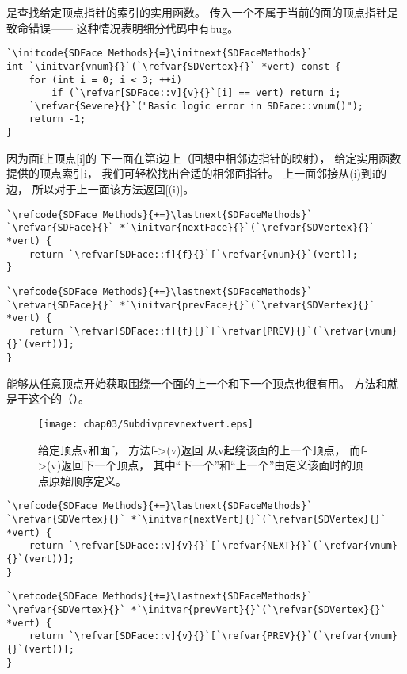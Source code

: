 是查找给定顶点指针的索引的实用函数。
传入一个不属于当前的面的顶点指针是致命错误——
这种情况表明细分代码中有bug。
\begin{lstlisting}
`\initcode{SDFace Methods}{=}\initnext{SDFaceMethods}`
int `\initvar{vnum}{}`(`\refvar{SDVertex}{}` *vert) const {
    for (int i = 0; i < 3; ++i)
        if (`\refvar[SDFace::v]{v}{}`[i] == vert) return i;
    `\refvar{Severe}{}`("Basic logic error in SDFace::vnum()");
    return -1;
}
\end{lstlisting}

因为面{\ttfamily f}上顶点{\ttfamily{}[i]}的
下一面在第i边上（回想中相邻边指针的映射），
给定实用函数提供的顶点索引{\ttfamily i}，
我们可轻松找出合适的相邻面指针。
上一面邻接从{\ttfamily{}(i)}到{\ttfamily i}的边，
所以对于上一面该方法返回{\ttfamily {}[(i)]}。
\begin{lstlisting}
`\refcode{SDFace Methods}{+=}\lastnext{SDFaceMethods}`
`\refvar{SDFace}{}` *`\initvar{nextFace}{}`(`\refvar{SDVertex}{}` *vert) {
    return `\refvar[SDFace::f]{f}{}`[`\refvar{vnum}{}`(vert)];
}
\end{lstlisting}
\begin{lstlisting}
`\refcode{SDFace Methods}{+=}\lastnext{SDFaceMethods}`
`\refvar{SDFace}{}` *`\initvar{prevFace}{}`(`\refvar{SDVertex}{}` *vert) {
    return `\refvar[SDFace::f]{f}{}`[`\refvar{PREV}{}`(`\refvar{vnum}{}`(vert))];
}
\end{lstlisting}

能够从任意顶点开始获取围绕一个面的上一个和下一个顶点也很有用。
方法和就是干这个的（）。
\begin{figure}[htbp]
    \centering\texttt{[image: chap03/Subdivprevnextvert.eps]}
    \caption{给定顶点{\ttfamily v}和面{\ttfamily f}，
    方法{\ttfamily f->\protect{}(v)}返回
    从{\ttfamily v}起绕该面的上一个顶点，
    而{\ttfamily f->\protect{}(v)}返回下一个顶点，
    其中“下一个”和“上一个”由定义该面时的顶点原始顺序定义。}
    \label{fig:3.31}
\end{figure}

\begin{lstlisting}
`\refcode{SDFace Methods}{+=}\lastnext{SDFaceMethods}`
`\refvar{SDVertex}{}` *`\initvar{nextVert}{}`(`\refvar{SDVertex}{}` *vert) {
    return `\refvar[SDFace::v]{v}{}`[`\refvar{NEXT}{}`(`\refvar{vnum}{}`(vert))];
}
\end{lstlisting}
\begin{lstlisting}
`\refcode{SDFace Methods}{+=}\lastnext{SDFaceMethods}`
`\refvar{SDVertex}{}` *`\initvar{prevVert}{}`(`\refvar{SDVertex}{}` *vert) {
    return `\refvar[SDFace::v]{v}{}`[`\refvar{PREV}{}`(`\refvar{vnum}{}`(vert))];
}
\end{lstlisting}

